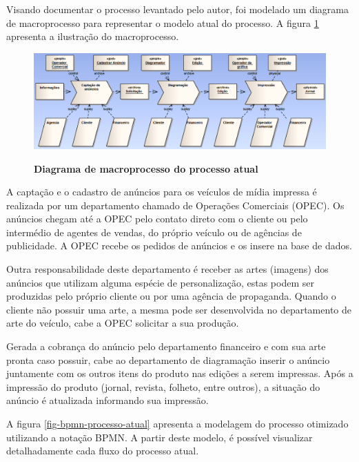 \documentclass[
	12pt,				%
	openright,			%
	oneside,			%
	a4paper,			%
	chapter=TITLE,		%
	section=TITLE,		%
	english,			%
	french,				%
	spanish,			%
	brazil				%
	]{abntex2}
\begin{document}
Visando documentar o processo levantado pelo autor, foi modelado um diagrama de macroprocesso para representar o modelo atual do processo. A figura \ref{fig-diag-macroprocesso} apresenta a ilustração do macroprocesso.

\begin{figure}[h]
	\begin{center}
		\caption{
			\textbf{Diagrama de macroprocesso do processo atual}
		}\label{fig-diag-macroprocesso}
		\includegraphics [scale=0.58]{imagens/diagrama_macro_processo.png}
		\label{fig-diag-macroprocesso}
	\end{center}
\end{figure}


A captação e o cadastro de anúncios para os veículos de mídia impressa é realizada por um departamento chamado de Operações Comerciais (OPEC). Os anúncios chegam até a OPEC pelo contato direto com o cliente ou pelo intermédio de agentes de vendas, do próprio veículo ou de agências de publicidade. A OPEC recebe os pedidos de anúncios e os insere na base de dados.

Outra responsabilidade deste departamento é receber as artes (imagens) dos anúncios que utilizam alguma espécie de personalização, estas podem ser produzidas pelo próprio cliente ou por uma agência de propaganda. Quando o cliente não possuir uma arte, a mesma pode ser desenvolvida no departamento de arte do veículo, cabe a OPEC solicitar a sua produção.

Gerada a cobrança do anúncio pelo departamento financeiro e com sua arte pronta caso possuir, cabe ao departamento de diagramação inserir o anúncio juntamente com os outros itens do produto nas edições a serem impressas. Após a impressão do produto (jornal, revista, folheto, entre outros), a situação do anúncio é atualizada informando sua impressão.

A figura \ref{fig-bpmn-processo-atual} apresenta a modelagem do processo otimizado utilizando a notação BPMN. A partir deste modelo, é possível visualizar detalhadamente cada fluxo do processo atual.
\end{document}
